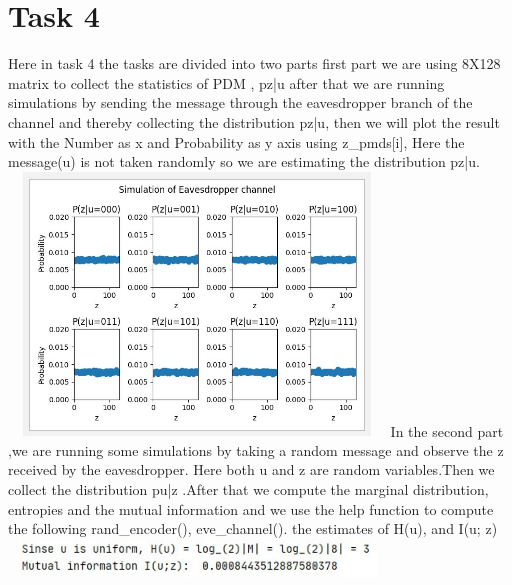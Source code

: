 \documentclass{report}
\begin{document}
\section*{Task 4}
Here in task 4 the tasks are divided into two parts first part we are using 8X128 matrix to collect the statistics of PDM , pz|u after that we are running simulations by sending the message through the eavesdropper branch of the channel and thereby collecting the distribution  pz|u, then we will plot the result with the Number as x and Probability as y axis using z\_pmds[i], Here the message(u) is not taken randomly so we are estimating the distribution pz|u. \hfill \break \linebreak
 \includegraphics[width=10cm,height=7cm]{4}  \hfill \break \linebreak
In the second part ,we are running some simulations  by taking a random message and observe the  z received by the eavesdropper. Here both u and z are random variables.Then we collect the distribution pu|z .After that we compute the marginal distribution, entropies and the mutual information and we use the help function to compute the following rand\_encoder(), eve\_channel().
the estimates of H(u), and I(u; z)\hfill \break \linebreak
  \includegraphics[width=10cm,height=1cm]{2.3.3}
\end{document}
